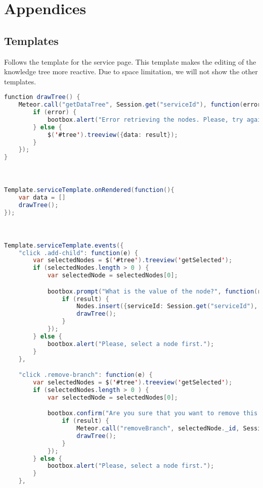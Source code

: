 \chapter{Appendices}
\label{sec:appendices}

\section*{Templates}

Follows the template for the service page.
This template makes the editing of the knowledge tree more reactive.
Due to space limitation, we will not show the other templates.

\begin{lstlisting}[language=java]
function drawTree() {
    Meteor.call("getDataTree", Session.get("serviceId"), function(error, result){
        if (error) {
            bootbox.alert("Error retrieving the nodes. Please, try again.")
        } else {
            $('#tree').treeview({data: result});
        }
    });
}



Template.serviceTemplate.onRendered(function(){
    var data = []
    drawTree();
});



Template.serviceTemplate.events({
    "click .add-child": function(e) {
        var selectedNodes = $('#tree').treeview('getSelected');
        if (selectedNodes.length > 0 ) {
            var selectedNode = selectedNodes[0];

            bootbox.prompt("What is the value of the node?", function(result) {                
                if (result) {                                             
                    Nodes.insert({serviceId: Session.get("serviceId"), parent: selectedNode._id, value: result});
                    drawTree();
                }
            });
        } else {
            bootbox.alert("Please, select a node first.");
        }
    },

    "click .remove-branch": function(e) {
        var selectedNodes = $('#tree').treeview('getSelected');
        if (selectedNodes.length > 0 ) {
            var selectedNode = selectedNodes[0];

            bootbox.confirm("Are you sure that you want to remove this node and ALL its descendants?", function(result) {                
                if (result) {                                             
                    Meteor.call("removeBranch", selectedNode._id, Session.get("serviceId"));
                    drawTree();
                }
            });
        } else {
            bootbox.alert("Please, select a node first.");
        }
    },


\end{lstlisting}
